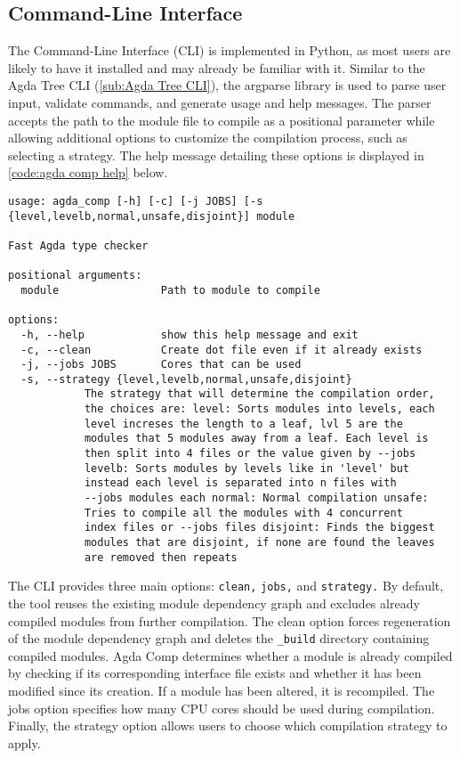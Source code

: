 \subsection{Command-Line Interface}

The Command-Line Interface (CLI) is implemented in Python, as most users are
likely to have it installed and may already be familiar with it. Similar to the
Agda Tree CLI (\cref{sub:Agda Tree CLI}), the argparse library is used to parse
user input, validate commands, and generate usage and help messages. The parser
accepts the path to the module file to compile as a positional parameter while
allowing additional options to customize the compilation process, such as
selecting a strategy. The help message detailing these options is displayed in
\cref{code:agda comp help} below.

\noindent
\begin{minipage}{\textwidth}
\begin{lstlisting}[caption={Agda Comp Help Message},label={code:agda comp help}]
usage: agda_comp [-h] [-c] [-j JOBS] [-s {level,levelb,normal,unsafe,disjoint}] module

Fast Agda type checker

positional arguments:
  module                Path to module to compile

options:
  -h, --help            show this help message and exit
  -c, --clean           Create dot file even if it already exists
  -j, --jobs JOBS       Cores that can be used
  -s, --strategy {level,levelb,normal,unsafe,disjoint}
			The strategy that will determine the compilation order,
			the choices are: level: Sorts modules into levels, each
			level increses the length to a leaf, lvl 5 are the
			modules that 5 modules away from a leaf. Each level is
			then split into 4 files or the value given by --jobs
			levelb: Sorts modules by levels like in 'level' but
			instead each level is separated into n files with
			--jobs modules each normal: Normal compilation unsafe:
			Tries to compile all the modules with 4 concurrent
			index files or --jobs files disjoint: Finds the biggest
			modules that are disjoint, if none are found the leaves
			are removed then repeats
\end{lstlisting}
\end{minipage}



The CLI provides three main options: \texttt{clean,} \texttt{jobs,} and
\texttt{strategy.} By default, the tool reuses the existing module dependency
graph and excludes already compiled modules from further compilation. The clean
option forces regeneration of the module dependency graph and deletes the
\texttt{\_build} directory containing compiled modules. Agda Comp determines
whether a module is already compiled by checking if its corresponding interface
file exists and whether it has been modified since its creation. If a module
has been altered, it is recompiled. The jobs option specifies how many CPU
cores should be used during compilation. Finally, the strategy option allows
users to choose which compilation strategy to apply.



